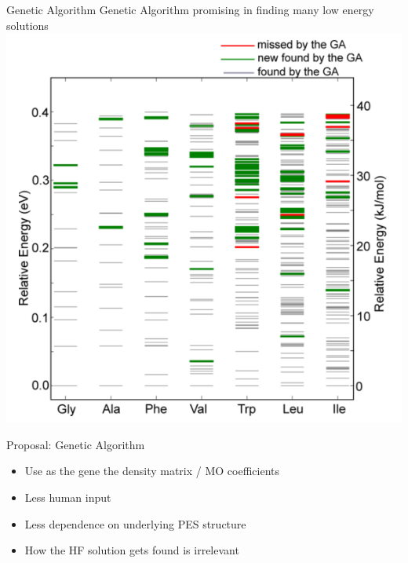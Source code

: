 \documentclass[10pt]{beamer}
\begin{document}
{{{{{{{{{{{{{
\begin{frame}{Genetic Algorithm}
  \centering
  Genetic Algorithm promising in finding many low energy solutions
	\includegraphics[width=.6\linewidth]{../figures/GA_supady.png}
\end{frame}

\begin{frame}{Proposal: Genetic Algorithm}
  \begin{itemize}
    \item{ Use as the gene the density matrix / MO coefficients }
    \item{ Less human input }
    \item{ Less dependence on underlying PES structure }
    \item{ How the HF solution gets found is irrelevant } 
  \end{itemize}
\end{frame}


}}}}}}}}}}}}}
\end{document}
